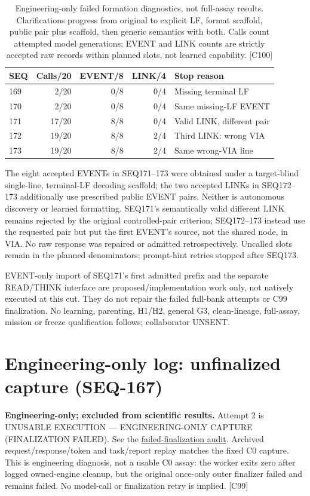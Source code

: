 \documentclass{article}
\begin{document}
\begin{table}[ht]
\centering\small
\begin{tabular}{lrrrl}
\toprule
SEQ & Calls/20 & EVENT/8 & LINK/4 & Stop reason \\
\midrule
169 & 2/20 & 0/8 & 0/4 & Missing terminal LF \\
170 & 2/20 & 0/8 & 0/4 & Same missing-LF EVENT \\
171 & 17/20 & 8/8 & 0/4 & Valid LINK, different pair \\
172 & 19/20 & 8/8 & 2/4 & Third LINK: wrong VIA \\
173 & 19/20 & 8/8 & 2/4 & Same wrong-VIA line \\
\bottomrule
\end{tabular}
\caption{Engineering-only failed formation diagnostics, not full-assay results.
Clarifications progress from original to explicit LF, format scaffold,
public pair plus scaffold, then generic semantics with both. Calls count
attempted model generations; EVENT and LINK counts are strictly accepted raw
records within planned slots, not learned capability. [C100]}
\end{table}

The eight accepted EVENTs in SEQ171--173 were obtained under a target-blind
single-line, terminal-LF decoding scaffold; the two accepted LINKs in SEQ172--173 additionally
use prescribed public EVENT pairs. Neither is autonomous discovery or learned
formatting. SEQ171's semantically valid different LINK remains rejected by the
original controlled-pair criterion; SEQ172--173 instead use the requested pair
but put the first EVENT's source, not the shared node, in VIA. No raw response
was repaired or admitted retrospectively. Uncalled slots remain in the planned
denominators; prompt-hint retries stopped after SEQ173.

EVENT-only import of SEQ171's first admitted prefix and the separate READ/THINK
interface are proposed/implementation work only, not natively executed at this
cut. They do not repair the failed full-bank attempts or C99 finalization.
No learning, parenting, H1/H2, general G3, clean-lineage, full-assay, mission or
freeze qualification follows; collaborator UNSENT.

\section{Engineering-only log: unfinalized capture (SEQ-167)}
\textbf{Engineering-only; excluded from scientific results.} Attempt 2 is
UNUSABLE EXECUTION --- ENGINEERING-ONLY CAPTURE (FINALIZATION FAILED).
See the \href{../research_notes/analysis/2026-09-13_pcfl_c0_attempt2_failed_finalization_audit.md}{failed-finalization audit}.
Archived request/response/token and task/report replay matches the fixed C0
capture. This is engineering diagnosis, not a usable C0 assay:
the worker exits zero after logged owned-engine cleanup, but the original
once-only outer finalizer failed and remains failed. No model-call or
finalization retry is implied. [C99]
\end{document}
